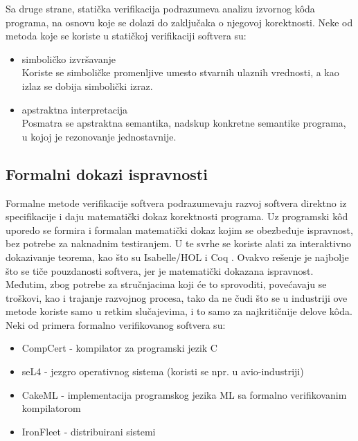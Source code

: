 \documentclass[a4paper]{article}
\begin{document}
Sa druge strane, statička verifikacija podrazumeva analizu izvornog k\^{o}da programa, na osnovu koje se dolazi do zaključaka o njegovoj korektnosti.
Neke od metoda koje se koriste u statičkoj verifikaciji softvera su:
\begin{itemize}
\item simboličko izvršavanje \cite{symbolic_execution}\\
Koriste se simboličke promenljive umesto stvarnih ulaznih vrednosti, a kao izlaz se dobija simbolički izraz.
\item apstraktna interpretacija \cite{abstract_interpretation}\\
Posmatra se apstraktna semantika, nadskup konkretne semantike programa, u kojoj je rezonovanje jednostavnije.

\end{itemize}


\subsection{Formalni dokazi ispravnosti}
\label{subsec:formalni_dokazi}
Formalne metode verifikacije softvera podrazumevaju razvoj softvera direktno iz specifikacije i daju matematički dokaz korektnosti programa.
Uz programski k\^{o}d uporedo se formira i formalan matematički dokaz kojim se obezbeđuje ispravnost, bez potrebe za naknadnim testiranjem.
U te svrhe se koriste alati za interaktivno dokazivanje teorema, kao što su Isabelle/HOL \cite{isabelle} i Coq \cite{coq}.
Ovakvo rešenje je najbolje što se tiče pouzdanosti softvera, jer je matematički dokazana ispravnost.
Međutim, zbog potrebe za stručnjacima koji će to sprovoditi, povećavaju se troškovi, kao i trajanje razvojnog procesa, tako da ne čudi što se u industriji ove metode koriste samo u retkim slučajevima, i to samo za najkritičnije delove k\^{o}da.\\
Neki od primera formalno verifikovanog softvera su:
\begin{itemize}
\item CompCert - kompilator za programski jezik C \cite{compcert}
\item seL4 - jezgro operativnog sistema (koristi se npr. u avio-industriji) \cite{sel4}
\item CakeML - implementacija programskog jezika ML sa formalno verifikovanim kompilatorom \cite{cakeml}
\item IronFleet - distribuirani sistemi \cite{ironfleet}
\end{itemize}
\end{document}
